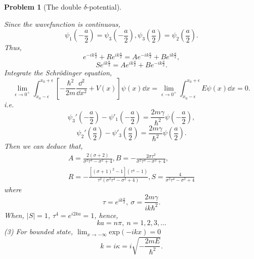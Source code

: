 \documentclass{article}
\theoremstyle{1}
\newtheorem{problem}{Problem}
\begin{document}
\begin{problem}[The double $\delta$-potential]
\begin{center}
\begin{tikzpicture}[x=0.7pt,y=0.7pt,yscale=-0.8,xscale=0.8]
\end{tikzpicture}
\end{center}
Since the wavefunction is continuous,
\begin{equation}
    \psi_1\left(-\frac{a}{2}\right)=\psi_3\left(-\frac{a}{2}\right), \psi_3\left(\frac{a}{2}\right)=\psi_2\left(\frac{a}{2}\right).
\end{equation}
Thus,
\begin{equation}
    e^{-ik\frac{a}{2}}+Re^{ik\frac{a}{2}}=Ae^{-ik\frac{a}{2}}+Be^{ik\frac{a}{2}},
\end{equation}
\begin{equation}
    Se^{ik\frac{a}{2}}=Ae^{ik\frac{a}{2}}+Be^{-ik\frac{a}{2}}.
\end{equation}
Integrate the Schrödinger equation,
\begin{equation}
    \lim_{\epsilon\rightarrow0^+}\int_{x_0-\epsilon}^{x_0+\epsilon}\left[-\frac{\hbar^2}{2m}\frac{\dd^2}{\dd{x}^2}+V(x)\right]\psi(x)\dd{x}=\lim_{\epsilon\rightarrow0^+}\int_{x_0-\epsilon}^{x_0+\epsilon}E\psi(x)\dd{x}=0.
\end{equation}
i.e.
\begin{equation}
    \psi_3'\left(-\frac{a}{2}\right)-\psi'_1\left(-\frac{a}{2}\right)=\frac{2m\gamma}{\hbar^2}\psi\left(-\frac{a}{2}\right),
\end{equation}
\begin{equation}
    \psi_2'\left(\frac{a}{2}\right)-\psi'_3\left(\frac{a}{2}\right)=\frac{2m\gamma}{\hbar^2}\psi\left(\frac{a}{2}\right).
\end{equation}
Then we can deduce that,
\begin{eqnarray}
    A=\frac{2 (\sigma +2)}{\sigma ^2 \tau ^4-\sigma ^2+4},B=-\frac{2 \sigma  \tau
   ^2}{\sigma ^2 \tau ^4-\sigma ^2+4},\\
   R=-\frac{\left[(\sigma+1)^2-1\right](\tau^4-1)}{\tau ^2 \left(\sigma ^2 \tau ^4-\sigma ^2+4\right)},S=\frac{4}{\sigma ^2
   \tau ^4-\sigma ^2+4}
\end{eqnarray}
where
\begin{equation}
    \tau=e^{ik\frac{a}{2}},\ \sigma=\frac{2m\gamma}{ik\hbar^2}.
\end{equation}
When, $\left|S\right|=1$, $\tau^4=e^{i2ka}=1$, hence,
\begin{equation}
   \boxed{ ka=n\pi, \ n=1,2,3,\dots}
\end{equation}
(3) For bounded state, $\displaystyle\lim_{x\rightarrow-\infty}\mathrm{exp}(-ikx)=0$
\begin{equation}
    k=i\kappa=i\sqrt{-\frac{2mE}{\hbar^2}}.

\end{equation}
\end{problem}
\end{document}
